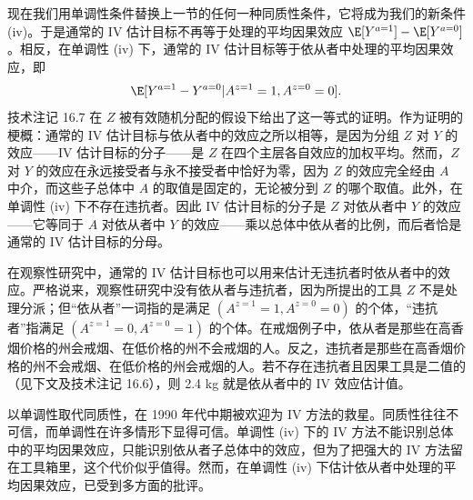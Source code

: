 \begin{figure}[!ht]
\centering
{}
\caption{}
\label{fig:16.7}
\end{figure}

现在我们用单调性条件替换上一节的任何一种同质性条件，它将成为我们的新条件 (iv)。于是通常的 IV 估计目标不再等于处理的平均因果效应 $\E[Y^{a=1}]-\E[Y^{a=0}]$。相反，在单调性 (iv) 下，通常的 IV 估计目标等于依从者中处理的平均因果效应，即
\[
\E[Y^{a=1}-Y^{a=0}|A^{z=1}=1,A^{z=0}=0].
\]
技术注记 16.7 在 $Z$ 被有效随机分配的假设下给出了这一等式的证明。作为证明的梗概：通常的 IV 估计目标与依从者中的效应之所以相等，是因为分组 $Z$ 对 $Y$ 的效应——IV 估计目标的分子——是 $Z$ 在四个主层各自效应的加权平均。然而，$Z$ 对 $Y$ 的效应在永远接受者与永不接受者中恰好为零，因为 $Z$ 的效应完全经由 $A$ 中介，而这些子总体中 $A$ 的取值是固定的，无论被分到 $Z$ 的哪个取值。此外，在单调性 (iv) 下不存在违抗者。因此 IV 估计目标的分子是 $Z$ 对依从者中 $Y$ 的效应——它等同于 $A$ 对依从者中 $Y$ 的效应——乘以总体中依从者的比例，而后者恰是通常的 IV 估计目标的分母。

在观察性研究中，通常的 IV 估计目标也可以用来估计无违抗者时依从者中的效应。严格说来，观察性研究中没有依从者与违抗者，因为所提出的工具 $Z$ 不是处理分派；但“依从者”一词指的是满足 $(A^{z=1}=1,A^{z=0}=0)$ 的个体，“违抗者”指满足 $(A^{z=1}=0,A^{z=0}=1)$ 的个体。在戒烟例子中，依从者是那些在高香烟价格的州会戒烟、在低价格的州不会戒烟的人。反之，违抗者是那些在高香烟价格的州不会戒烟、在低价格的州会戒烟的人。若不存在违抗者且因果工具是二值的（见下文及技术注记 16.6），则 2.4 kg 就是依从者中的 IV 效应估计值。

以单调性取代同质性，在 1990 年代中期被欢迎为 IV 方法的救星。同质性往往不可信，而单调性在许多情形下显得可信。单调性 (iv) 下的 IV 方法不能识别总体中的平均因果效应，只能识别依从者子总体中的效应，但为了把强大的 IV 方法留在工具箱里，这个代价似乎值得。然而，在单调性 (iv) 下估计依从者中处理的平均因果效应，已受到多方面的批评。

